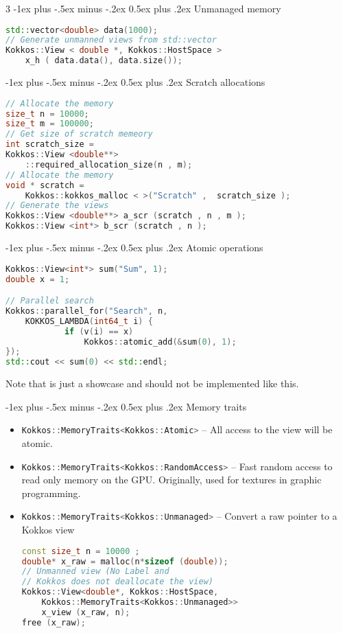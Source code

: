 \documentclass[10pt,landscape]{article}
\makeatletter
\renewcommand{\section}{\@startsection{section}{1}{0mm}%
                                {-1ex plus -.5ex minus -.2ex}%
                                {0.5ex plus .2ex}%
                                {\normalfont\large\bfseries}}
\newcommand{\cpp}[1]{\lstinline[language=c++]{#1}}
\makeatother
\begin{document}
\begin{multicols}{3}
\section{Unmanaged memory}
\begin{lstlisting}[language=c++,style=mystyle]
std::vector<double> data(1000);
// Generate unmanned views from std::vector
Kokkos::View < double *, Kokkos::HostSpace > 
	x_h ( data.data(), data.size());
\end{lstlisting} 

\section{Scratch allocations}

\begin{lstlisting}[language=c++,style=mystyle]
// Allocate the memory
size_t n = 10000;
size_t m = 100000;
// Get size of scratch memeory
int scratch_size =
Kokkos::View <double**>
	::required_allocation_size(n , m);
// Allocate the memory
void * scratch =
	Kokkos::kokkos_malloc < >("Scratch" ,  scratch_size );
// Generate the views
Kokkos::View <double**> a_scr (scratch , n , m );
Kokkos::View <int*> b_scr (scratch , n );
\end{lstlisting}

\section{Atomic operations}

\begin{lstlisting}[language=c++,style=mystyle]
Kokkos::View<int*> sum("Sum", 1);
double x = 1;

// Parallel search
Kokkos::parallel_for("Search", n, 
	KOKKOS_LAMBDA(int64_t i) {
			if (v(i) == x) 
				Kokkos::atomic_add(&sum(0), 1);
});
std::cout << sum(0) << std::endl;
\end{lstlisting} 
Note that is just a showcase and should not be implemented like this.

\section{Memory traits}
\begin{itemize}
\item \cpp{Kokkos::MemoryTraits<Kokkos::Atomic>} -- All access to the view will be atomic.
 \item \cpp{Kokkos::MemoryTraits<Kokkos::RandomAccess>} -- Fast random access to read only memory on the GPU. Originally, used for textures in graphic programming.  
 \item \cpp{Kokkos::MemoryTraits<Kokkos::Unmanaged>} -- Convert a raw pointer to a Kokkos view
 \begin{lstlisting}[language=c++,style=mystyle]
const size_t n = 10000 ;
double* x_raw = malloc(n*sizeof (double));
// Unmanned view (No Label and 
// Kokkos does not deallocate the view)
Kokkos::View<double*, Kokkos::HostSpace, 
	Kokkos::MemoryTraits<Kokkos::Unmanaged>>
    x_view (x_raw, n);
free (x_raw);
\end{lstlisting} 
 \end{itemize}


\end{multicols}
\end{document}
